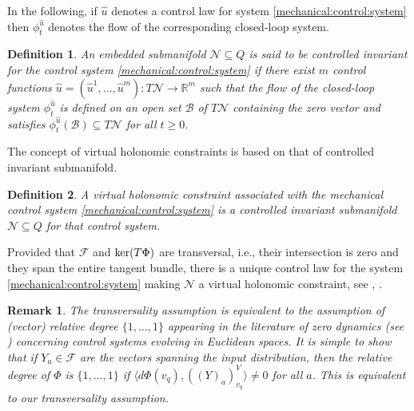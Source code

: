 \documentclass[letterpaper, 10 pt, conference]{ieeeconf}
\newtheorem{definition}{Definition}
\newtheorem{remark}{Remark}
\begin{document}
In the following, if $\hat{u}$ denotes a control law for system \eqref{mechanical:control:system} then $\phi_{t}^{\hat{u}}$ denotes the flow of the corresponding closed-loop system.



\begin{definition}\label{control:invariant:definition}
    An embedded submanifold $\mathcal{N}\subseteq Q$ is said to be controlled invariant for the control system \eqref{mechanical:control:system} if there exist $m$ control functions $\hat{u}=(\hat{u}^{1}, \ldots, \hat{u}^{m}):T\mathcal{N}\rightarrow \mathbb{R}^{m}$ such that the flow of the closed-loop system $\phi_{t}^{\hat{u}}$ is defined on an open set $\mathcal{B}$ of $T\mathcal{N}$ containing the zero vector and satisfies $\phi_{t}^{\hat{u}}(\mathcal{B})\subseteq T\mathcal{N}$ for all $t\geqslant 0$.
\end{definition}

The concept of virtual holonomic constraints is based on that of controlled invariant submanifold.

\begin{definition}
A \textit{virtual holonomic constraint} associated with the mechanical control system \eqref{mechanical:control:system} is a controlled invariant submanifold $\mathcal{N}\subseteq Q$ for that control system. %
\end{definition}

Provided that $\mathcal{F}$ and $\hbox{ker}(T\Phi)$ are transversal, i.e., their intersection is zero and they span the entire tangent bundle, there is a unique control law for the system \eqref{mechanical:control:system} making $\mathcal{N}$ a virtual holonomic constraint, see \cite{consolini2018coordinate}, \cite{consolini2015induced}.

\begin{remark}\label{remarkzd}
    The transversality assumption is equivalent to the assumption of (vector) relative degree $\{1,\ldots,1\}$ appearing in the literature of zero dynamics (see \cite{isidori1985nonlinear}) concerning control systems evolving in Euclidean spaces. It is simple to show that if $Y_{a}\in \mathcal{F}$ are the vectors spanning the input distribution, then the relative degree of $\Phi$ is $\{1,\ldots,1\}$ if $\langle d\Phi(v_{q}), ((Y)_{a})_{v_{q}}^{V} \rangle \neq 0$ for all $a$. This is equivalent to our transversality assumption. 
\end{remark}
\end{document}
